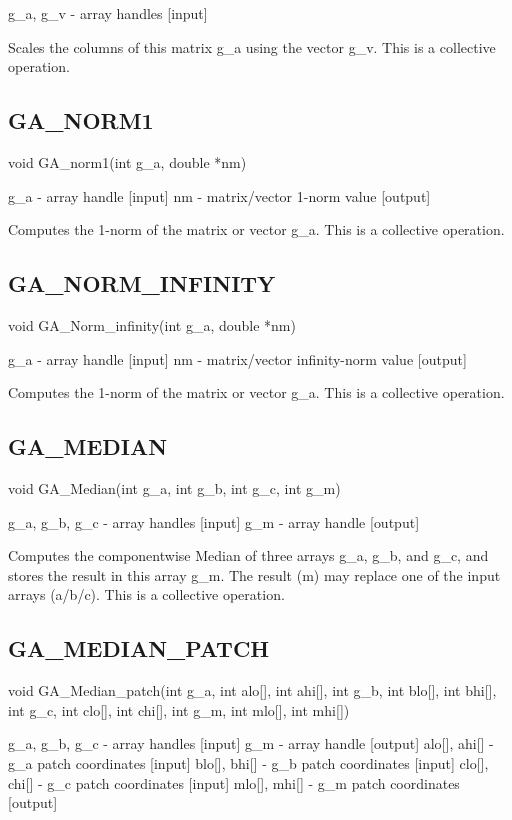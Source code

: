 g\_a, g\_v - array handles {[}input{]}

Scales the columns of this matrix g\_a using the vector g\_v. This
is a collective operation. 


\subsection*{GA\_NORM1}

void GA\_norm1(int g\_a, double {*}nm)

g\_a - array handle {[}input{]} nm - matrix/vector 1-norm value {[}output{]}

Computes the 1-norm of the matrix or vector g\_a. This is a collective
operation. 


\subsection*{GA\_NORM\_INFINITY}

void GA\_Norm\_infinity(int g\_a, double {*}nm)

g\_a - array handle {[}input{]} nm - matrix/vector infinity-norm value
{[}output{]}

Computes the 1-norm of the matrix or vector g\_a. This is a collective
operation. 


\subsection*{GA\_MEDIAN}

void GA\_Median(int g\_a, int g\_b, int g\_c, int g\_m)

g\_a, g\_b, g\_c - array handles {[}input{]} g\_m - array handle {[}output{]}

Computes the componentwise Median of three arrays g\_a, g\_b, and
g\_c, and stores the result in this array g\_m. The result (m) may
replace one of the input arrays (a/b/c). This is a collective operation. 


\subsection*{GA\_MEDIAN\_PATCH}

void GA\_Median\_patch(int g\_a, int alo{[}{]}, int ahi{[}{]}, int
g\_b, int blo{[}{]}, int bhi{[}{]}, int g\_c, int clo{[}{]}, int chi{[}{]},
int g\_m, int mlo{[}{]}, int mhi{[}{]})

g\_a, g\_b, g\_c - array handles {[}input{]} g\_m - array handle {[}output{]}
alo{[}{]}, ahi{[}{]} - g\_a patch coordinates {[}input{]} blo{[}{]},
bhi{[}{]} - g\_b patch coordinates {[}input{]} clo{[}{]}, chi{[}{]}
- g\_c patch coordinates {[}input{]} mlo{[}{]}, mhi{[}{]} - g\_m patch
coordinates {[}output{]}

